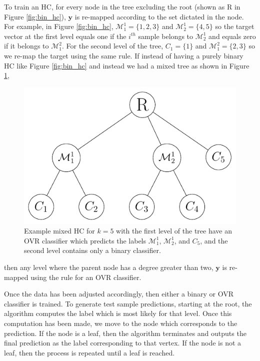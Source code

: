 \documentclass[../thesis.tex]{subfiles}
\begin{document}
To train an HC, for every node in the tree excluding the root (shown as R in
Figure \ref{fig:bin_hc}), $\mathbf{y}$ is re-mapped according to the set
dictated in the node. For example, in Figure \ref{fig:bin_hc}, $\mathcal{M}_1^1 =
\{1, 2, 3\}$ and $\mathcal{M}_2^1 = \{4, 5\}$ so the target vector at the first
level equals one if the $i^{th}$ sample belongs to $\mathcal{M}_2^1$ and equals
zero if it belongs to $\mathcal{M}_1^2$. For the second level of the tree, $C_1 =
\{1\}$ and $\mathcal{M}_1^2 = \{2, 3\}$ so we re-map the target using the same
rule. If instead of having a purely binary HC like Figure \ref{fig:bin_hc} and
instead we had a mixed tree as shown in Figure \ref{fig:ovr_hc},
\begin{figure}
    \centering
    \includegraphics{images/ovr_hc.pdf}

    \caption[Example Mixed Hierarchical Classifier]{Example mixed HC for $k=5$
    with the first level of the tree have an OVR classifier which predicts the
    labels $\mathcal{M}_1^1$, $\mathcal{M}_2^1$, and $C_5$, and the second level
    contains only a binary classifier.}

    \label{fig:ovr_hc}
\end{figure}

then any level where the parent node has a degree greater than two, $\mathbf{y}$
is re-mapped using the rule for an OVR classifier.

Once the data has been adjusted accordingly, then either a binary or OVR
classifier is trained. To generate test sample predictions, starting at the
root, the algorithm computes the label which is most likely for that level. Once
this computation has been made, we move to the node which corresponds to the
prediction. If the node is a leaf, then the algorithm terminates and outputs the
final prediction as the label corresponding to that vertex. If the node is not a
leaf, then the process is repeated until a leaf is reached.
\end{document}
